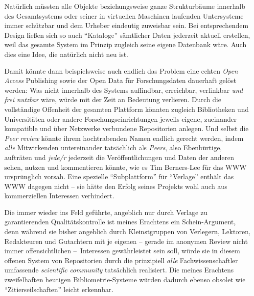 \documentclass[a4paper,
fontsize=11pt,
oneside,
numbers=noperiodatend,
parskip=half-,
bibliography=totoc,
final
]{scrartcl}
\begin{document}
Natürlich müssten alle Objekte beziehungsweise ganze Strukturbäume
innerhalb des Gesamtsystems oder seiner in virtuellen Maschinen
laufenden Untersysteme immer schützbar und dem Urheber eindeutig
zuweisbar sein. Bei entsprechendem Design ließen sich so auch
\enquote{Kataloge} sämtlicher Daten jederzeit aktuell erstellen, weil
das gesamte System im Prinzip zugleich seine eigene Datenbank wäre. Auch
dies eine Idee, die natürlich nicht neu ist.

Damit könnte dann beispielsweise auch endlich das Problem eine echten
\emph{Open Access} Publishing sowie der Open Data für Forschungsdaten
dauerhaft gelöst werden: Was nicht innerhalb des Systems auffindbar,
erreichbar, verlinkbar \emph{und frei nutzbar} wäre, würde mit der Zeit
an Bedeutung verlieren. Durch die vollständige Offenheit der gesamten
Plattform könnten zugleich Bibliotheken und Universitäten oder andere
Forschungseinrichtungen jeweils eigene, zueinander kompatible und über
Netzwerke verbundene Repositorien anlegen. Und selbst die \emph{Peer
review} könnte ihrem hochtrabenden Namen endlich gerecht werden, indem
\emph{alle} Mitwirkenden untereinander tatsächlich als \emph{Peers},
also Ebenbürtige, aufträten und \emph{jede/r} jederzeit die
Veröffentlichungen und Daten der anderen sehen, nutzen und kommentieren
könnte, wie es Tim Berners-Lee für das WWW ursprünglich vorsah. Eine
spezielle \enquote{Subplattform} für \enquote{Verlage} enthält das WWW
dagegen nicht -- sie hätte den Erfolg seines Projekts wohl auch aus
kommerziellen Interessen verhindert.

Die immer wieder ins Feld geführte, angeblich nur durch Verlage zu
garantierenden Qualitätskontrolle ist meines Erachtens ein
Schein-Argument, denn während sie bisher angeblich durch Kleinstgruppen
von Verlegern, Lektoren, Redakteuren und Gutachtern mit je eigenen --
gerade im anonymen Review nicht immer offensichtlichen --~Interessen
gewährleistet sein soll, würde sie in diesem offenen System von
Repositorien durch die prinzipiell \emph{alle} Fachwissenschaftler
umfassende \emph{scientific community} tatsächlich realisiert. Die
meines Erachtens zweifelhaften heutigen Bibliometrie-Systeme würden
dadurch ebenso obsolet wie \enquote{Zitierseilschaften} leicht
erkennbar.
\end{document}
